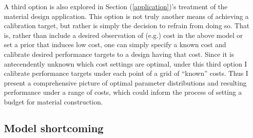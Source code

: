 \documentclass{article}
\begin{document}
A third option is also explored in Section (\ref{application})'s treatment of the material design application. This option is not truly another means of achieving a calibration target, but rather is simply the decision to refrain from doing so. That is, rather than include a desired observation of (e.g.) cost in the above model or set a prior that induces low cost, one can simply specify a known cost and calibrate desired performance targets to a design having that cost. Since it is antecendently unknown which cost settings are optimal, under this third option I calibrate performance targets under each point of a grid of ``known'' costs. Thus I present a comprehensive picture of optimal parameter distributions and resulting performance under a range of costs, which could inform the process of setting a budget for material construction.

\subsection{Model shortcoming}\label{model_shortcoming}
\end{document}
